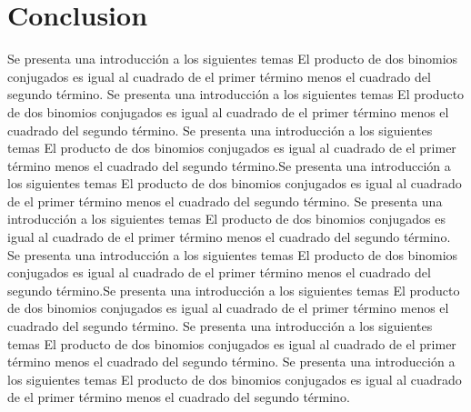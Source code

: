 \documentclass[journal]{IEEEtran}
\begin{document}
\section{Conclusion}
Se presenta una introducción a los siguientes temas El producto de dos binomios conjugados es igual al cuadrado de el primer término menos el cuadrado del segundo término.
Se presenta una introducción a los siguientes temas El producto de dos binomios conjugados es igual al cuadrado de el primer término menos el cuadrado del segundo término.
Se presenta una introducción a los siguientes temas El producto de dos binomios conjugados es igual al cuadrado de el primer término menos el cuadrado del segundo término.Se presenta una introducción a los siguientes temas El producto de dos binomios conjugados es igual al cuadrado de el primer término menos el cuadrado del segundo término.
Se presenta una introducción a los siguientes temas El producto de dos binomios conjugados es igual al cuadrado de el primer término menos el cuadrado del segundo término.
Se presenta una introducción a los siguientes temas El producto de dos binomios conjugados es igual al cuadrado de el primer término menos el cuadrado del segundo término.Se presenta una introducción a los siguientes temas El producto de dos binomios conjugados es igual al cuadrado de el primer término menos el cuadrado del segundo término.
Se presenta una introducción a los siguientes temas El producto de dos binomios conjugados es igual al cuadrado de el primer término menos el cuadrado del segundo término.
Se presenta una introducción a los siguientes temas El producto de dos binomios conjugados es igual al cuadrado de el primer término menos el cuadrado del segundo término.
\end{document}

